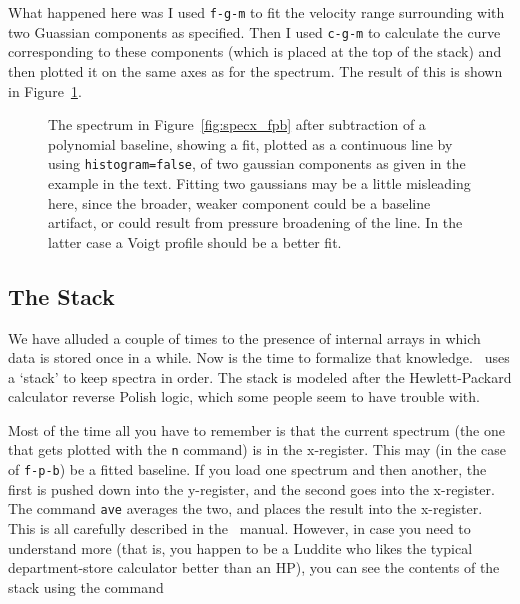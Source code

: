 What happened here was I used {\tt f-g-m} to fit the velocity range
surrounding with two Guassian components as specified. Then I used
{\tt c-g-m} to calculate the curve corresponding to these components
(which is placed at the top of the stack) and then plotted it on the
same axes as for the spectrum.  The result of this is shown in
Figure~\ref{fig:specx_fgm}.

\begin{figure}[htb]
\centering
\leavevmode
\epsfysize=3.2in
\vspace*{-0.5cm}
\begin{center}
\begin{minipage}[t]{5in}
\caption[A gaussian model fit]
{\small{The spectrum in Figure~\ref{fig:specx_fpb} after subtraction
of a polynomial baseline, showing a fit, plotted as a continuous line
by using {\tt histogram=false}, of two gaussian components as given in
the example in the text. Fitting two gaussians may be a little
misleading here, since the broader, weaker component could be a
baseline artifact, or could result from pressure broadening of the
line. In the latter case a Voigt profile should be a better fit.  }}
\label{fig:specx_fgm}
\end{minipage}
\end{center}
\end{figure}

\subsection{The Stack}
\label{sec:specx_6}
We have alluded a couple of times to the presence of internal arrays
in which data is stored once in a while. Now is the time to formalize
that knowledge.
\SPECX\ uses a `stack' to keep spectra in order.  The stack is modeled after
the Hewlett-Packard calculator reverse Polish logic, which some people
seem to have trouble with.

Most of the time all you have to remember is that the current spectrum
(the one that gets plotted with the {\tt n} command) is in the
x-register. This may (in the case of {\tt f-p-b}) be a fitted
baseline. If you load one spectrum and then another, the first is
pushed down into the y-register, and the second goes into the
x-register. The command {\tt ave} averages the two, and places the
result into the x-register. This is all carefully described in the
\SPECX\ manual. However, in case you need to understand more (that is,
you happen to be a Luddite who likes the typical department-store
calculator better than an HP), you can see the contents of the stack
using the command

